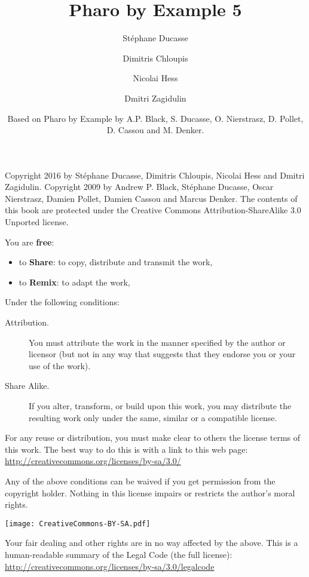\documentclass[10pt,twoside,english]{support/latex/sbabook/sbabook}
\title{Pharo by Example 5}
\author{
    St\'ephane Ducasse \and
    Dimitris Chloupis \and Nicolai Hess \and Dmitri Zagidulin}
\date{Based on Pharo by Example by A.P. Black, S. Ducasse, O. Nierstrasz, D. Pollet, D. Cassou and M. Denker.\titlebreak[\smallskip]{ -- }\gitdate\titlebreak[\smallskip]{ -- }\protect\gitCommitInfo}
\begin{document}
\maketitle
\pagestyle{titlingpage}
\thispagestyle{titlingpage} %

\cleartoverso
{\small
  Copyright 2016 by St\'ephane Ducasse, Dimitris Chloupis, Nicolai Hess and Dmitri Zagidulin.
  Copyright 2009 by Andrew P. Black, St\'ephane Ducasse, Oscar Nierstrasz, Damien Pollet, Damien Cassou and Marcus Denker.
  The contents of this book are protected under the Creative Commons
  Attribution-ShareAlike 3.0 Unported license.

  You are \textbf{free}:
  \begin{itemize}
  \item to \textbf{Share}: to copy, distribute and transmit the work,
  \item to \textbf{Remix}: to adapt the work,
  \end{itemize}

  Under the following conditions:
  \begin{description}
  \item[Attribution.] You must attribute the work in the manner specified by the
    author or licensor (but not in any way that suggests that they endorse you
    or your use of the work).
  \item[Share Alike.] If you alter, transform, or build upon this work, you may
    distribute the resulting work only under the same, similar or a compatible
    license.
  \end{description}

  For any reuse or distribution, you must make clear to others the
  license terms of this work. The best way to do this is with a link to
  this web page: \\
  \url{http://creativecommons.org/licenses/by-sa/3.0/}

  Any of the above conditions can be waived if you get permission from
  the copyright holder. Nothing in this license impairs or restricts the
  author's moral rights.

  \begin{center}
    \texttt{[image: CreativeCommons-BY-SA.pdf]}
  \end{center}

  Your fair dealing and other rights are in no way affected by the
  above. This is a human-readable summary of the Legal Code (the full
  license): \\
  \url{http://creativecommons.org/licenses/by-sa/3.0/legalcode}

}
\end{document}
